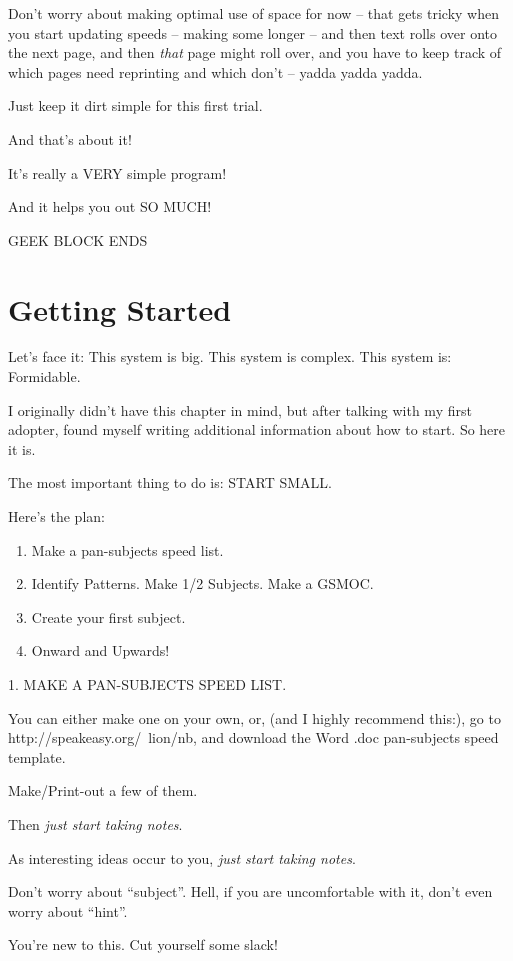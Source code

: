 \documentclass[oneside]{scrbook}
\begin{document}
Don't worry about making optimal use of space for now -- that gets
tricky when you start updating speeds -- making some longer -- and then
text rolls over onto the next page, and then \emph{that} page might roll
over, and you have to keep track of which pages need reprinting and
which don't -- yadda yadda yadda.

Just keep it dirt simple for this first trial.


And that's about it!

It's really a VERY simple program!

And it helps you out SO MUCH!

GEEK BLOCK ENDS


\chapter{Getting Started}
Let's face it: This system is big. This system is complex. This system
is: Formidable.

I originally didn't have this chapter in mind, but after talking with
my first adopter, found myself writing additional information about
how to start. So here it is.

The most important thing to do is:
START SMALL.

Here's the plan:

\begin{enumerate}
\item Make a pan-subjects speed list.
\item Identify Patterns. Make 1/2 Subjects. Make a GSMOC.
\item Create your first subject.
\item Onward and Upwards!
\end{enumerate}

1. MAKE A PAN-SUBJECTS SPEED LIST.

You can either make one on your own, or, (and I highly recommend
this:), go to http://speakeasy.org/~lion/nb, and download the Word
.doc pan-subjects speed template.

Make/Print-out a few of them.

Then \emph{just start taking notes}.

As interesting ideas occur to you, \emph{just start taking notes}.

Don't worry about ``subject''. Hell, if you are uncomfortable with it,
don't even worry about ``hint''.

You're new to this. Cut yourself some slack!
\end{document}
